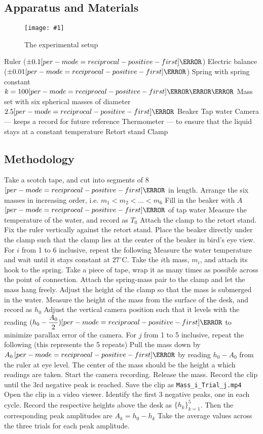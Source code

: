 \documentclass[a4paper,12pt]{article}
\let\oldsi\si
\renewcommand{\si}[1]{\oldsi[per-mode=reciprocal-positive-first]{#1}}
\newcommand{\degsym}{^{\circ}}
\newcommand{\img}[4]{\begin{center}
  \begin{figure}[H]
    \centering
    \texttt{[image: \#1]}
    \caption{#3}
    \label{fig:#4}
  \end{figure}
\end{center}}
\begin{document}
\pagebreak

\subsection{Apparatus and Materials}
\img{figs/setup.png}{0.8}{The experimental setup}{setup}
\begin{outline}[enumerate]
  \1 Ruler ($\pm 0.1\si{\cm}$)
  \1 Electric balance ($\pm 0.01\si{\g}$)
  \1 Spring with spring constant $k = 100\si{\N\per\m}$
  \1 Mass set with six spherical masses of diameter $2.5\si{\cm}$
  \1 Beaker
  \1 Tap water
  \1 Camera --- keeps a record for future reference
  \1 Thermometer --- to ensure that the liquid stays at a constant temperature
  \1 Retort stand
  \1 Clamp
\end{outline}

\subsection{Methodology}

\begin{outline}[enumerate]
  \1 Take a scotch tape, and cut into segments of $8$ $\si{\cm}$ in length.
  \1 Arrange the six masses in increasing order, i.e. $m_1 < m_2 < ... < m_6$
  \1 Fill in the beaker with $A$ $\si{\mL}$ of tap water
  \1 Measure the temperature of the water, and record as $T_0$
  \1 Attach the clamp to the retort stand.
  \1 Fix the ruler vertically against the retort stand.
  \1 Place the beaker directly under the clamp such that the clamp lies at the center of the beaker in bird's eye view.
  \1 For $i$ from 1 to 6 inclusive, repeat the following
  \2 Measure the water temperature and wait until it stays constant at $27\degsym \text{C}$.
  \2 Take the $i$th mass, $m_i$, and attach its hook to the spring.
  \2 Take a piece of tape, wrap it as many times as possible across the point of connection.
  \2 Attach the spring-mass pair to the clamp and let the mass hang freely.
  \2 Adjust the height of the clamp so that the mass is submerged in the water.
  \2 Measure the height of the mass from the surface of the desk, and record as $h_0$
  \2 Adjust the vertical camera position such that it levels with the reading $(h_0 - \dfrac{A_0}{2}) \si{\cm}$ to minimize parallax error of the camera.
  \2 For $j$ from 1 to 5 inclusive, repeat the following (this represents the 5 repeats)
  \3 Pull the mass down by $A_0\,\si{\cm}$ by reading $h_0 - A_0$ from the ruler at eye level. The center of the mass should be the height a which readings are taken.
  \3 Start the camera recording.
  \3 Release the mass.
  \3 Record the clip until the 3rd negative peak is reached.
  \3 Save the clip as \verb|Mass_i_Trial_j.mp4|
  \3 Open the clip in a video viewer.
  \3 Identify the first 3 negative peaks, one in each cycle.
  \3 Record the respective heights above the desk as $\{h_k\}^{5}_{k=1}$.
  \3 Then the corresponding peak amplitudes are $A_k = h_0 - h_{k}$
  \2 Take the average values across the three trials for each peak amplitude.
\end{outline}
\end{document}
